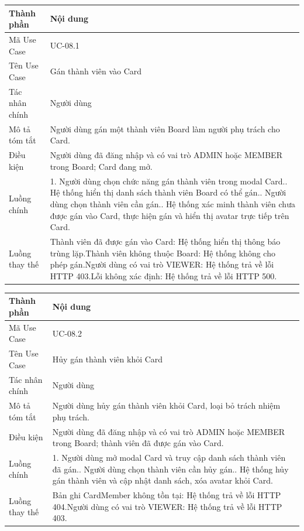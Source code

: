 \vspace{0.3cm}
\noindent\begin{tabular}{|p{3.5cm}|p{10.5cm}|}
\hline
\textbf{Thành phần} & \textbf{Nội dung} \\
\hline
Mã Use Case & UC-08.1 \\
\hline
Tên Use Case & Gán thành viên vào Card \\
\hline
Tác nhân chính & Người dùng \\
\hline
Mô tả tóm tắt & Người dùng gán một thành viên Board làm người phụ trách cho Card. \\
\hline
Điều kiện & Người dùng đã đăng nhập và có vai trò ADMIN hoặc MEMBER trong Board; Card đang mở. \\
\hline
Luồng chính & 1. Người dùng chọn chức năng gán thành viên trong modal Card.\newline 2. Hệ thống hiển thị danh sách thành viên Board có thể gán.\newline 3. Người dùng chọn thành viên cần gán.\newline 4. Hệ thống xác minh thành viên chưa được gán vào Card, thực hiện gán và hiển thị avatar trực tiếp trên Card. \\
\hline
Luồng thay thế & Thành viên đã được gán vào Card: Hệ thống hiển thị thông báo trùng lặp.\newline Thành viên không thuộc Board: Hệ thống không cho phép gán.\newline Người dùng có vai trò VIEWER: Hệ thống trả về lỗi HTTP 403.\newline Lỗi không xác định: Hệ thống trả về lỗi HTTP 500. \\
\hline
\end{tabular}

\vspace{0.5cm}
\noindent\begin{tabular}{|p{3.5cm}|p{10.5cm}|}
\hline
\textbf{Thành phần} & \textbf{Nội dung} \\
\hline
Mã Use Case & UC-08.2 \\
\hline
Tên Use Case & Hủy gán thành viên khỏi Card \\
\hline
Tác nhân chính & Người dùng \\
\hline
Mô tả tóm tắt & Người dùng hủy gán thành viên khỏi Card, loại bỏ trách nhiệm phụ trách. \\
\hline
Điều kiện & Người dùng đã đăng nhập và có vai trò ADMIN hoặc MEMBER trong Board; thành viên đã được gán vào Card. \\
\hline
Luồng chính & 1. Người dùng mở modal Card và truy cập danh sách thành viên đã gán.\newline 2. Người dùng chọn thành viên cần hủy gán.\newline 3. Hệ thống hủy gán thành viên và cập nhật danh sách, xóa avatar khỏi Card. \\
\hline
Luồng thay thế & Bản ghi CardMember không tồn tại: Hệ thống trả về lỗi HTTP 404.\newline Người dùng có vai trò VIEWER: Hệ thống trả về lỗi HTTP 403. \\
\hline
\end{tabular}

